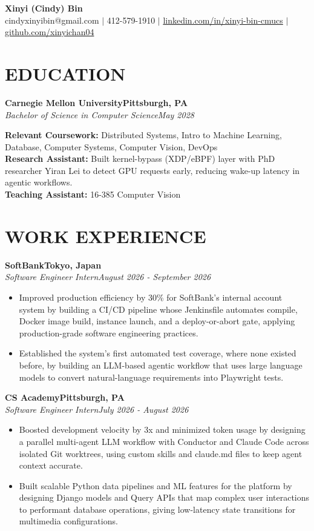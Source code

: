 \documentclass[10pt,letterpaper]{article}
\newcommand{\entry}[4]{%
  \textbf{#1}\hfill\textbf{#2}\\
  \textit{#3}\hfill\textit{#4}\par}
\begin{document}
\begin{center}
  {\fontsize{16pt}{18pt}\selectfont\bfseries Xinyi (Cindy) Bin}\\[1pt]
  cindyxinyibin@gmail.com $|$ 412-579-1910 $|$
  \href{https://www.linkedin.com/in/xinyi-bin-cmucs/}{linkedin.com/in/xinyi-bin-cmucs} $|$
  \href{https://github.com/xinyichan04}{github.com/xinyichan04}
\end{center}
\vspace{-12pt}

\section*{EDUCATION}
\entry{Carnegie Mellon University}{Pittsburgh, PA}{Bachelor of Science in Computer Science}{May 2028}
\vspace{2pt}
\textbf{Relevant Coursework:} Distributed Systems, Intro to Machine Learning, Database, Computer Systems, Computer Vision, DevOps\\
\textbf{Research Assistant:} Built kernel-bypass (XDP/eBPF) layer with PhD researcher Yiran Lei to detect GPU requests early, reducing wake-up latency in agentic workflows.\\
\textbf{Teaching Assistant:} 16-385 Computer Vision

\section*{WORK EXPERIENCE}
\entry{SoftBank}{Tokyo, Japan}{Software Engineer Intern}{August 2026 - September 2026}
\begin{itemize}
  \item Improved production efficiency by 30\% for SoftBank's internal account system by building a CI/CD pipeline whose Jenkinsfile automates compile, Docker image build, instance launch, and a deploy-or-abort gate, applying production-grade software engineering practices.
  \item Established the system's first automated test coverage, where none existed before, by building an LLM-based agentic workflow that uses large language models to convert natural-language requirements into Playwright tests.
\end{itemize}

\entry{CS Academy}{Pittsburgh, PA}{Software Engineer Intern}{July 2026 - August 2026}
\begin{itemize}
  \item Boosted development velocity by 3x and minimized token usage by designing a parallel multi-agent LLM workflow with Conductor and Claude Code across isolated Git worktrees, using custom skills and claude.md files to keep agent context accurate.
  \item Built scalable Python data pipelines and ML features for the platform by designing Django models and Query APIs that map complex user interactions to performant database operations, giving low-latency state transitions for multimedia configurations.
\end{itemize}
\end{document}
